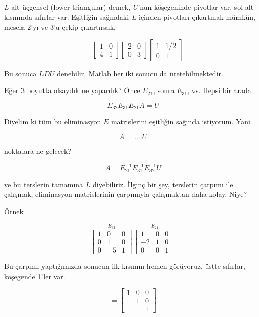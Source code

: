 \documentclass[12pt,fleqn]{article}\usepackage{../../common}
\begin{document}
$L$ alt üçgensel (\textbf{l}ower triangular) demek, $U$'nun köşegeninde
pivotlar var, sol alt kısmında sıfırlar var. Eşitliğin sağındaki $L$ içinden
pivotları çıkartmak mümkün, mesela 2'yı ve 3'u çekip çıkartırsak, 

$$ 
= \left[\begin{array}{rr}
1 & 0 \\ 4 & 1
\end{array}\right]
\left[\begin{array}{rr}
2 & 0 \\ 0 & 3
\end{array}\right]
\left[\begin{array}{rr}
1 & 1/2 \\ 0 & 1
\end{array}\right]
 $$

Bu sonuca $LDU$ denebilir, Matlab her iki sonucu da üretebilmektedir. 

Eğer 3 boyutta olsaydık ne yapardık? Önce $E_{21}$, sonra $E_{31}$,
vs. Hepsi bir arada

$$ E_{32}E_{31}E_{21} A = U$$

Diyelim ki tüm bu eliminasyon $E$ matrislerini eşitliğin sağında
istiyorum. Yani

$$ A = ....U $$

noktalara ne gelecek? 

$$ A = E_{21} ^{-1}  E_{31} ^{-1}  E_{32} ^{-1}  U$$

ve bu terslerin tamamına $L$ diyebiliriz. İlginç bir şey, terslerin
çarpımı ile çalışmak, eliminasyon matrislerinin çarpımıyla çalışmaktan daha
kolay. Niye?

Örnek

$$ 
\stackrel{E_{32}}{
\left[\begin{array}{rrr}
1 & 0 & 0 \\
0 & 1 & 0 \\
0 & -5 & 1
\end{array}\right] }
\stackrel{{E_{21}}}{
\left[\begin{array}{rrr}
1 & 0 & 0 \\
-2 & 1 & 0 \\
0 & 0 & 1
\end{array}\right]}
 $$

Bu çarpımı yaptığımızda sonucun ilk kısmını hemen görüyoruz, üstte
sıfırlar, köşegende 1'ler var.

$$ = 
\left[\begin{array}{rrr}
1 & 0 & 0 \\
 & 1 & 0 \\
 &  & 1
\end{array}\right]
 $$
\end{document}
